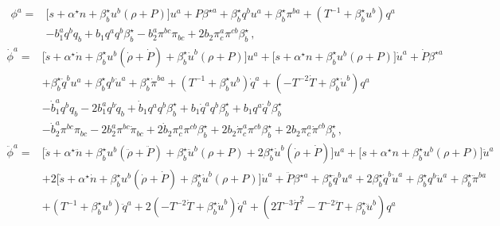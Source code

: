 \documentclass[a4paper, amsfonts, amssymb, amsmath, reprint, showkeys, nofootinbib, twoside, onecolumn, notitlepage]{revtex4-1}
\theoremstyle{definition}
\theoremstyle{theorem}
\begin{document}
\begin{fleqn}
\begin{equation}
\begin{split}
\phi^a ={}& \big[s +\alpha^\star n + \beta^\star_b u^b (\rho+P) \big]u^a +P \beta^{\star a}  
+ \beta^\star_b q^b u^a + \beta^\star_b \pi^{ba} + ( T^{-1}  + \beta^\star_b u^b)q^a 
\\
& - b_1^a q^b q_b  + b_1 q^a q^b \beta^\star_b - b_2^a \pi^{bc}\pi_{bc} +2b_2 \pi^a_c\pi^{cb}\beta^\star_b \, ,  
\end{split} 
\end{equation}
%
\begin{equation}
\begin{split}
\dot{\phi}^a ={ } & \big[ \dot{s}+\alpha^\star \dot{n} + \beta_b^\star u^b (\dot{\rho}+\dot{P})  + \beta_b^\star \dot{u}^b (\rho+P) \big]u^a+ \big[ s+\alpha^\star n + \beta_b^\star u^b (\rho+P) \big]\dot{u}^a +\dot{P}\beta^{\star a} 
\\
&  + \beta^\star_b \dot{q}^b u^a+\beta^\star_b q^b \dot{u}^a + \beta^\star_b \dot{\pi}^{ba} +(T^{-1}  + \beta^\star_b u^b)\dot{q}^a+( -T^{-2}\dot{T}  + \beta^\star_b \dot{u}^b)q^a 
\\
& - \dot{b}_1^a q^b q_b-2b_1^a q^b \dot{q}_b  + \dot{b}_1 q^a q^b \beta^\star_b+b_1 \dot{q}^a q^b \beta^\star_b +b_1 q^a \dot{q}^b \beta^\star_b 
\\
& - \dot{b}_2^a \pi^{bc} \pi_{bc} -2b_2^a \pi^{bc}\dot{\pi}_{bc} +2\dot{b}_2 \pi^a_c\pi^{cb}\beta^\star_b + 2b_2 \dot{\pi}^a_c\pi^{cb}\beta^\star_b +2b_2 \pi^a_c\dot{\pi}^{cb}\beta^\star_b \, ,  
\end{split}
\end{equation}
%
\begin{equation}
\begin{split}
\ddot{\phi}^a ={ } & \big[ \ddot{s}+\alpha^\star \ddot{n} + \beta_b^\star u^b (\ddot{\rho}+\ddot{P})  + \beta_b^\star \ddot{u}^b (\rho+P) +2\beta_b^\star \dot{u}^b (\dot{\rho}+\dot{P}) \big]u^a+ \big[ s+\alpha^\star n + \beta_b^\star u^b (\rho+P) \big]\ddot{u}^a 
\\ 
& +2 \big[ \dot{s}+\alpha^\star \dot{n} + \beta_b^\star u^b (\dot{\rho}+\dot{P})  + \beta_b^\star \dot{u}^b (\rho+P) \big]\dot{u}^a+\ddot{P}\beta^{\star a} + \beta^\star_b \ddot{q}^b u^a+2 \beta^\star_b \dot{q}^b \dot{u}^a+\beta^\star_b q^b \ddot{u}^a + \beta^\star_b \ddot{\pi}^{ba} 
\\
& + ( T^{-1}  + \beta^\star_b u^b)\ddot{q}^a+2( -T^{-2}\dot{T}  + \beta^\star_b \dot{u}^b)\dot{q}^a+( 2 T^{-3}\dot{T}^2 -T^{-2}\ddot{T}  + \beta^\star_b \ddot{u}^b)q^a 

\end{split}
\end{equation}
\end{fleqn}
\end{document}
